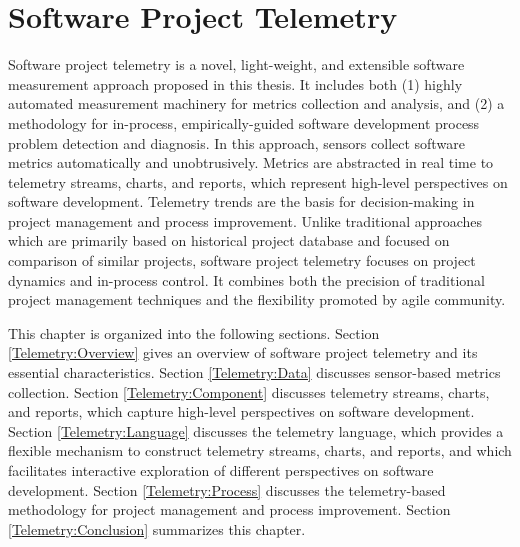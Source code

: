 \chapter{Software Project Telemetry}
\label{Chapter:Telemetry}


Software project telemetry is a novel, light-weight, and extensible software measurement approach proposed in this thesis. It includes both (1) highly automated measurement machinery for metrics collection and analysis, and (2) a methodology for in-process, empirically-guided software development process problem detection and diagnosis. In this approach, sensors collect software metrics automatically and unobtrusively. Metrics are abstracted in real time to telemetry streams, charts, and reports, which represent high-level perspectives on software development. Telemetry trends are the basis for decision-making in project management and process improvement. Unlike traditional approaches which are primarily based on historical project database and focused on comparison of similar projects, software project telemetry focuses on project dynamics and in-process control. It combines both the precision of traditional project management techniques and the flexibility promoted by agile community.

This chapter is organized into the following sections. 
Section \ref{Telemetry:Overview} gives an overview of software project 
        telemetry and its essential characteristics.
Section \ref{Telemetry:Data} discusses sensor-based metrics 
        collection. 
Section \ref{Telemetry:Component} discusses telemetry streams, 
        charts, and reports, which capture high-level perspectives on software development.
Section \ref{Telemetry:Language} discusses the telemetry language, which
        provides a flexible mechanism to construct telemetry streams, charts, 
        and reports, and which facilitates interactive exploration of different perspectives 
        on software development.
Section \ref{Telemetry:Process} discusses the telemetry-based methodology for 
        project management and process improvement.
Section \ref{Telemetry:Conclusion} summarizes this chapter.







